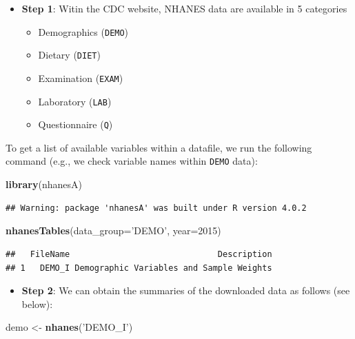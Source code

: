 \documentclass[
]{book}
\newenvironment{Shaded}{\begin{snugshade}}{\end{snugshade}}
\newcommand{\DataTypeTok}[1]{\textcolor[rgb]{0.13,0.29,0.53}{#1}}
\newcommand{\DecValTok}[1]{\textcolor[rgb]{0.00,0.00,0.81}{#1}}
\newcommand{\KeywordTok}[1]{\textcolor[rgb]{0.13,0.29,0.53}{\textbf{#1}}}
\newcommand{\NormalTok}[1]{#1}
\newcommand{\StringTok}[1]{\textcolor[rgb]{0.31,0.60,0.02}{#1}}
\providecommand{\tightlist}{%
  \setlength{\itemsep}{0pt}\setlength{\parskip}{0pt}}
\begin{document}
\begin{itemize}
\tightlist
\item
  \textbf{Step 1}: Witin the CDC website, NHANES data are available in 5 categories

  \begin{itemize}
  \tightlist
  \item
    Demographics (\texttt{DEMO})
  \item
    Dietary (\texttt{DIET})
  \item
    Examination (\texttt{EXAM})
  \item
    Laboratory (\texttt{LAB})
  \item
    Questionnaire (\texttt{Q})
  \end{itemize}
\end{itemize}

To get a list of available variables within a datafile, we run the following command (e.g., we check variable names within \texttt{DEMO} data):

\begin{Shaded}
\begin{Highlighting}[]
\KeywordTok{library}\NormalTok{(nhanesA)}
\end{Highlighting}
\end{Shaded}

\begin{verbatim}
## Warning: package 'nhanesA' was built under R version 4.0.2
\end{verbatim}

\begin{Shaded}
\begin{Highlighting}[]
\KeywordTok{nhanesTables}\NormalTok{(}\DataTypeTok{data_group=}\StringTok{'DEMO'}\NormalTok{, }\DataTypeTok{year=}\DecValTok{2015}\NormalTok{)}
\end{Highlighting}
\end{Shaded}

\begin{verbatim}
##   FileName                              Description
## 1   DEMO_I Demographic Variables and Sample Weights
\end{verbatim}

\begin{itemize}
\tightlist
\item
  \textbf{Step 2}: We can obtain the summaries of the downloaded data as follows (see below):
\end{itemize}

\begin{Shaded}
\begin{Highlighting}[]
\NormalTok{demo <-}\StringTok{ }\KeywordTok{nhanes}\NormalTok{(}\StringTok{'DEMO_I'}\NormalTok{)}
\end{Highlighting}
\end{Shaded}
\end{document}
